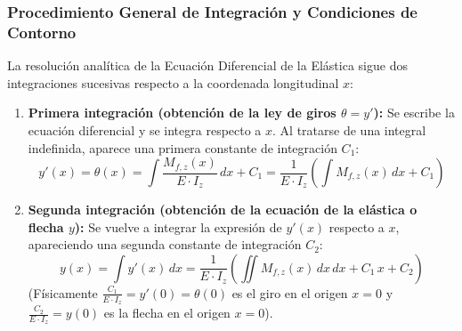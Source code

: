 \subsubsection{Procedimiento General de Integración y Condiciones de Contorno}

La resolución analítica de la Ecuación Diferencial de la Elástica sigue dos integraciones sucesivas respecto a la coordenada longitudinal $x$:
\begin{enumerate}
    \item \textbf{Primera integración (obtención de la ley de giros $\theta = y'$):} Se escribe la ecuación diferencial y se integra respecto a $x$. Al tratarse de una integral indefinida, aparece una primera constante de integración $C_1$:
          \begin{equation}
              y'(x) = \theta(x) = \int \frac{M_{f,z}(x)}{E \cdot I_z} \, dx + C_1 = \frac{1}{E \cdot I_z} \left( \int M_{f,z}(x) \, dx + C_1 \right)
          \end{equation}
    \item \textbf{Segunda integración (obtención de la ecuación de la elástica o flecha $y$):} Se vuelve a integrar la expresión de $y'(x)$ respecto a $x$, apareciendo una segunda constante de integración $C_2$:
          \begin{equation}
              y(x) = \int y'(x) \, dx = \frac{1}{E \cdot I_z} \left( \iint M_{f,z}(x) \, dx \, dx + C_1 \, x + C_2 \right)
          \end{equation}
          (Físicamente $\frac{C_1}{E \cdot I_z} = y'(0) = \theta(0)$ es el giro en el origen $x = 0$ y $\frac{C_2}{E \cdot I_z} = y(0)$ es la flecha en el origen $x = 0$).
\end{enumerate}

